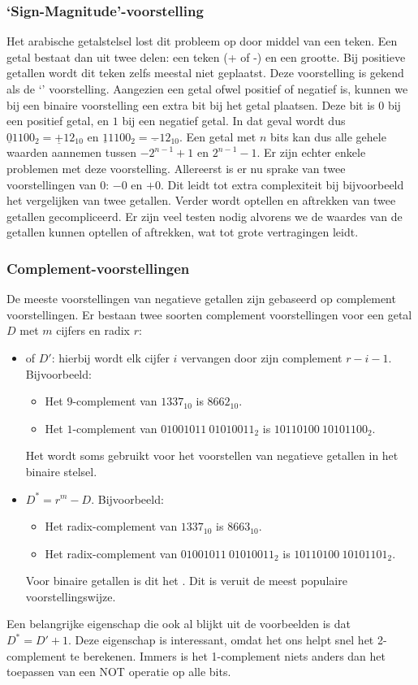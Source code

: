 \subsubsection{`Sign-Magnitude'-voorstelling}
Het arabische getalstelsel lost dit probleem op door middel van een teken. Een getal bestaat dan uit twee delen: een teken (+ of -) en een grootte. Bij positieve getallen wordt dit teken zelfs meestal niet geplaatst. Deze voorstelling is gekend als de `' voorstelling. Aangezien een getal ofwel positief of negatief is, kunnen we bij een binaire voorstelling een extra bit bij het getal plaatsen. Deze bit is $0$ bij een positief getal, en $1$ bij een negatief getal. In dat geval wordt dus $\underline{0}1100_2=\underline{+}12_{10}$ en $\underline{1}1100_2=\underline{-}12_{10}$. Een getal met $n$ bits kan dus alle gehele waarden aannemen tussen $-2^{n-1}+1$ en $2^{n-1}-1$. Er zijn echter enkele problemen met deze voorstelling. Allereerst is er nu sprake van twee voorstellingen van $0$: $-0$ en $+0$. Dit leidt tot extra complexiteit bij bijvoorbeeld het vergelijken van twee getallen. Verder wordt optellen en aftrekken van twee getallen gecompliceerd. Er zijn veel testen nodig alvorens we de waardes van de getallen kunnen optellen of aftrekken, wat tot grote vertragingen leidt.
\subsubsection{Complement-voorstellingen}
De meeste voorstellingen van negatieve getallen zijn gebaseerd op complement voorstellingen. Er bestaan twee soorten complement voorstellingen voor een getal $D$ met $m$ cijfers en radix $r$:
\begin{itemize}
 \item {} of  $D'$: hierbij wordt elk cijfer $i$ vervangen door zijn complement $r-i-1$. Bijvoorbeeld:
 \begin{itemize}
    \item Het $9$-complement van $1337_{10}$ is $8662_{10}$.
    \item Het $1$-complement van $01001011\ 01010011_2$ is $10110100\ 10101100_2$.
 \end{itemize}
 Het  wordt soms gebruikt voor het voorstellen van negatieve getallen in het binaire stelsel.
 \item {} $D^*=r^m-D$. Bijvoorbeeld:
 \begin{itemize}
    \item Het radix-complement van $1337_{10}$ is $8663_{10}$.
    \item Het radix-complement van $01001011\ 01010011_2$ is $10110100\ 10101101_2$.
 \end{itemize}
 Voor binaire getallen is dit het . Dit is veruit de meest populaire voorstellingswijze.
\end{itemize}
Een belangrijke eigenschap die ook al blijkt uit de voorbeelden is dat $D^*=D'+1$. Deze eigenschap is interessant, omdat het ons helpt snel het 2-complement te berekenen. Immers is het 1-complement niets anders dan het toepassen van een NOT operatie op alle bits.
